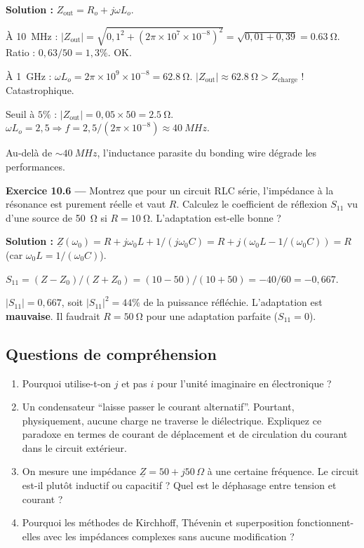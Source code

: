 \documentclass[12pt,a4paper,twoside]{book}
\begin{document}
\begin{pratique}
\textbf{Solution :} $Z_{\text{out}} = R_o + j\omega L_o$.

À \SI{10}{MHz} : $|Z_{\text{out}}| = \sqrt{0{,}1^2 + (2\pi\times10^7\times10^{-8})^2} = \sqrt{0{,}01 + 0{,}39} = \SI{0.63}{\ohm}$. Ratio : $0{,}63/50 = 1{,}3\%$. OK.

À \SI{1}{GHz} : $\omega L_o = 2\pi\times10^9\times10^{-8} = \SI{62.8}{\ohm}$. $|Z_{\text{out}}| \approx \SI{62.8}{\ohm} > Z_{\text{charge}}$ ! Catastrophique.

Seuil à $5\%$ : $|Z_{\text{out}}| = 0{,}05 \times 50 = \SI{2.5}{\ohm}$. $\omega L_o = 2{,}5 \Rightarrow f = 2{,}5/(2\pi\times10^{-8}) \approx \SI{40}{MHz}$.

Au-delà de $\sim\SI{40}{MHz}$, l'inductance parasite du bonding wire dégrade les performances.
\end{pratique}

\textbf{Exercice 10.6 ---} Montrez que pour un circuit RLC série, l'impédance à la résonance est purement réelle et vaut $R$. Calculez le coefficient de réflexion $S_{11}$ vu d'une source de \SI{50}{\ohm} si $R = \SI{10}{\ohm}$. L'adaptation est-elle bonne ?

\begin{pratique}
\textbf{Solution :} $\underline{Z}(\omega_0) = R + j\omega_0 L + 1/(j\omega_0 C) = R + j(\omega_0 L - 1/(\omega_0 C)) = R$ (car $\omega_0 L = 1/(\omega_0 C)$). \checkmark

$S_{11} = (Z - Z_0)/(Z + Z_0) = (10-50)/(10+50) = -40/60 = -0{,}667$.

$|S_{11}| = 0{,}667$, soit $|S_{11}|^2 = 44\%$ de la puissance réfléchie. L'adaptation est \textbf{mauvaise}. Il faudrait $R = \SI{50}{\ohm}$ pour une adaptation parfaite ($S_{11} = 0$).
\end{pratique}

\subsection*{Questions de compréhension}

\begin{enumerate}[nosep]
\item Pourquoi utilise-t-on $j$ et pas $i$ pour l'unité imaginaire en électronique ?
\item Un condensateur ``laisse passer le courant alternatif''. Pourtant, physiquement, aucune charge ne traverse le diélectrique. Expliquez ce paradoxe en termes de courant de déplacement et de circulation du courant dans le circuit extérieur.
\item On mesure une impédance $\underline{Z} = 50 + j50\,\Omega$ à une certaine fréquence. Le circuit est-il plutôt inductif ou capacitif ? Quel est le déphasage entre tension et courant ?
\item Pourquoi les méthodes de Kirchhoff, Thévenin et superposition fonctionnent-elles avec les impédances complexes sans aucune modification ?
\end{enumerate}
\end{document}
